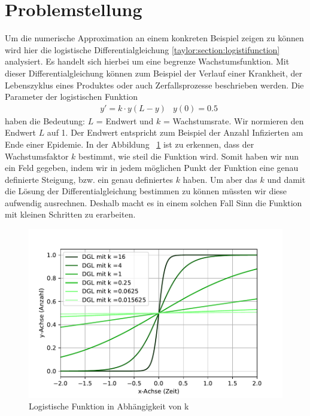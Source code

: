 %
%
%
\section{Problemstellung
\label{taylor:section:problemstellung}}
Um die numerische Approximation an einem konkreten Beispiel zeigen zu können wird hier die logistische Differentialgleichung \eqref{taylor:section:logistifunction} analysiert.
Es handelt sich hierbei um eine begrenze Wachstumsfunktion. 
Mit dieser Differentialgleichung können zum Beispiel der Verlauf einer Krankheit, der Lebenszyklus eines Produktes oder auch Zerfallsprozesse beschrieben werden. Die Parameter der logistischen Funktion
\begin{align*}
	&y' = k\cdot y(L-y) 
	&y(0) = 0.5
	\label{taylor:section:logistifunction}
\end{align*}
haben die Bedeutung: $L$ = Endwert und $k$ = Wachstumsrate.
Wir normieren den Endwert $L$ auf 1.
Der Endwert entspricht zum Beispiel der Anzahl Infizierten am Ende einer Epidemie.
In der Abbildung ~\ref{taylor:section:fig:DGLDarstellung} ist zu erkennen, dass der Wachstumsfaktor $k$ bestimmt, wie steil die Funktion wird.
Somit haben wir nun ein Feld gegeben, indem wir in jedem möglichen Punkt der Funktion eine genau definierte Steigung, bzw. ein genau definiertes $k$ haben.
Um aber das $k$ und damit die Lösung der Differentialgleichung bestimmen zu können müssten wir diese aufwendig ausrechnen.
Deshalb macht es in einem solchen Fall Sinn die Funktion mit kleinen Schritten zu erarbeiten.

\begin{figure}
	\centering
	\includegraphics[width=12cm]{papers/taylor/taylorPictures/DGLDarstellung.pdf}
	\caption{Logistische Funktion in Abhängigkeit von k}
	\label{taylor:section:fig:DGLDarstellung}
\end{figure}

